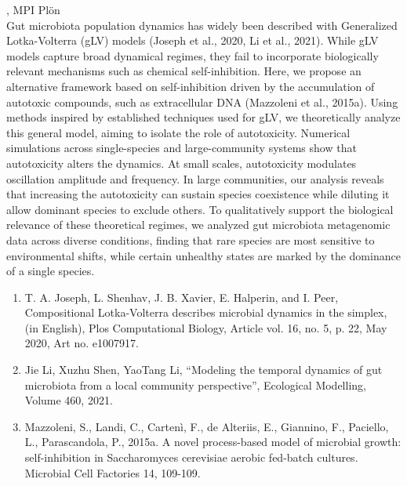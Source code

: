 \documentclass[12pt,a4paper]{article}
\begin{document}
, MPI Plön \\[2ex] Gut microbiota population dynamics has widely been described with Generalized Lotka-Volterra (gLV) models (Joseph et al., 2020, Li et al., 2021). While gLV models capture broad dynamical regimes, they fail to incorporate biologically relevant mechanisms such as chemical self-inhibition. Here, we propose an alternative framework based on self-inhibition driven by the accumulation of autotoxic compounds, such as extracellular DNA (Mazzoleni et al., 2015a). Using methods inspired by established techniques used for gLV, we theoretically analyze this general model, aiming to isolate the role of autotoxicity. Numerical simulations across single-species and large-community systems show that autotoxicity alters the dynamics. At small scales, autotoxicity modulates oscillation amplitude and frequency. In large communities, our analysis reveals that increasing the autotoxicity can sustain species coexistence while diluting it allow dominant species to exclude others. To qualitatively support the biological relevance of these theoretical regimes, we analyzed gut microbiota metagenomic data across diverse conditions, finding that rare species are most sensitive to environmental shifts, while certain unhealthy states are marked by the dominance of a single species.

 \begin{enumerate} \item T. A. Joseph, L. Shenhav, J. B. Xavier, E. Halperin, and I. Peer, Compositional Lotka-Volterra describes microbial dynamics in the simplex, (in English), Plos Computational Biology, Article vol. 16, no. 5, p. 22, May 2020, Art no. e1007917. 
 \item Jie Li, Xuzhu Shen, YaoTang Li, “Modeling the temporal dynamics of gut microbiota from a local community perspective”, Ecological Modelling, Volume 460, 2021. 
 \item Mazzoleni, S., Landi, C., Cartenì, F., de Alteriis, E., Giannino, F., Paciello, L., Parascandola, P.,             2015a. A novel process-based model of microbial growth: self-inhibition in Saccharomyces cerevisiae aerobic fed-batch cultures. Microbial Cell Factories 14, 109-109. \end{enumerate} 
\end{document}
